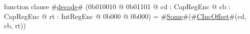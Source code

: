 function clause #\hyperref[zdecode]{decode}# (0b010010 @ 0b01101 @ cd : CapRegEnc @ cb : CapRegEnc @ rt : IntRegEnc @ 0b000 @ 0b000) = #\hyperref[zSome]{Some}#(#\hyperref[zCIncOffset]{CIncOffset}#(cd, cb, rt))

